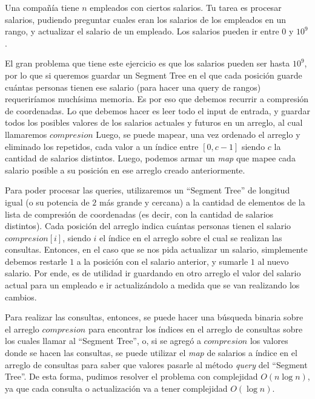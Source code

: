 \documentclass{article}
\begin{document}
\begin{tcolorbox}
Una compañía tiene $n$ empleados con ciertos salarios. Tu tarea es procesar salarios, pudiendo preguntar cuales eran los salarios de los empleados en un rango, y actualizar el salario de un empleado. Los salarios pueden ir entre $0$ y $10^9$.
\end{tcolorbox}

El gran problema que tiene este ejercicio es que los salarios pueden ser hasta $10^9$, por lo que si queremos guardar un Segment Tree en el que cada posición guarde cuántas personas tienen ese salario (para hacer una query de rangos) requeriríamos muchísima memoria. Es por eso que debemos recurrir a compresión de coordenadas. Lo que debemos hacer es leer todo el input de entrada, y guardar todos los posibles valores de los salarios actuales y futuros en un arreglo, al cual llamaremos $compresion$ Luego, se puede mapear, una vez ordenado el arreglo y eliminado los repetidos, cada valor a un índice entre $[0, c-1]$ siendo $c$ la cantidad de salarios distintos. Luego, podemos armar un \textit{map} que mapee cada salario posible a su posición en ese arreglo creado anteriormente.

Para poder procesar las queries, utilizaremos un ``Segment Tree'' de longitud igual (o su potencia de $2$ más grande y cercana) a la cantidad de elementos de la lista de compresión de coordenadas (es decir, con la cantidad de salarios distintos). Cada posición del arreglo indica cuántas personas tienen el salario $compresion[i]$, siendo $i$ el índice en el arreglo sobre el cual se realizan las consultas. Entonces, en el caso que se nos pida actualizar un salario, simplemente debemos restarle $1$ a la posición con el salario anterior, y sumarle $1$ al nuevo salario. Por ende, es de utilidad ir guardando en otro arreglo el valor del salario actual para un empleado e ir actualizándolo a medida que se van realizando los cambios.

Para realizar las consultas, entonces, se puede hacer una búsqueda binaria sobre el arreglo $compresion$ para encontrar los índices en el arreglo de consultas sobre los cuales llamar al ``Segment Tree'', o, si se agregó a $compresion$ los valores donde se hacen las consultas, se puede utilizar el \textit{map} de salarios a índice en el arreglo de consultas para saber que valores pasarle al método \textit{query} del ``Segment Tree''. De esta forma, pudimos resolver el problema con complejidad $O(n \log n)$, ya que cada consulta o actualización va a tener complejidad $O(\log n)$.
\end{document}
